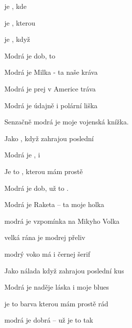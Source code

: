 

      

\zs
{} je , kde  

 je , kterou 

 je , když  

Modrá je dob,  to 
\ks

\zs
Modrá je Milka - ta naše kráva

Modrá je prej v Americe tráva

Modrá je údajně i polární liška

Senzačně modrá je moje vojenská knížka.
\ks

\zr
Jako , když zahrajou poslední 

Modrá je ,  i  

Je to , kterou mám prostě 

Modrá je dob, už  to .
\kr

\zs
Modrá je Raketa -- ta moje holka

modrá je vzpomínka na Mikyho Volka

velká rána je modrej přeliv

modrý voko má i černej šerif
\ks

\zs
Jako nálada když zahrajou poslední kus

Modrá je naděje láska i moje blues

je to barva kterou mám prostě rád

modrá je dobrá -- už je to tak
\ks

         

\kp





